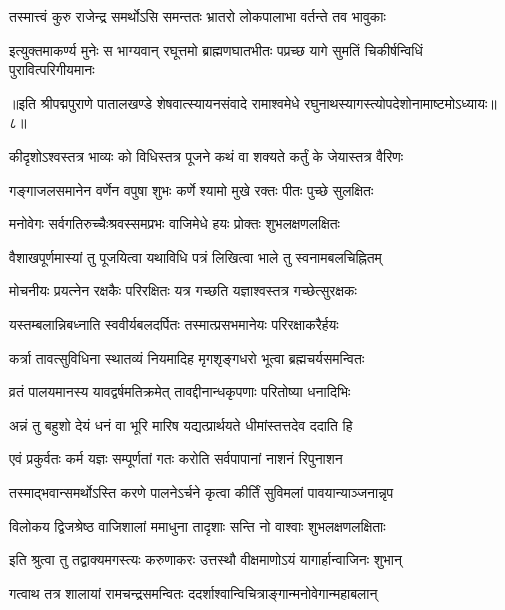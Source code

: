 \twolineshloka
{तस्मात्त्वं कुरु राजेन्द्र समर्थोऽसि समन्ततः}
{भ्रातरो लोकपालाभा वर्तन्ते तव भावुकाः}%

\twolineshloka
{इत्युक्तमाकर्ण्य मुनेः स भाग्यवान् रघूत्तमो ब्राह्मणघातभीतः}
{पप्रच्छ यागे सुमतिं चिकीर्षन्विधिं पुरावित्परिगीयमानः}%

{॥इति श्रीपद्मपुराणे पातालखण्डे शेषवात्स्यायनसंवादे रामाश्वमेधे रघुनाथस्यागस्त्योपदेशोनामाष्टमोऽध्यायः॥८॥}

\resetShloka


\twolineshloka
{कीदृशोऽश्वस्तत्र भाव्यः को विधिस्तत्र पूजने}
{कथं वा शक्यते कर्तुं के जेयास्तत्र वैरिणः}%


\twolineshloka
{गङ्गाजलसमानेन वर्णेन वपुषा शुभः}
{कर्णे श्यामो मुखे रक्तः पीतः पुच्छे सुलक्षितः}%

\twolineshloka
{मनोवेगः सर्वगतिरुच्चैःश्रवस्समप्रभः}
{वाजिमेधे हयः प्रोक्तः शुभलक्षणलक्षितः}%

\twolineshloka
{वैशाखपूर्णमास्यां तु पूजयित्वा यथाविधि}
{पत्रं लिखित्वा भाले तु स्वनामबलचिह्नितम्}%

\twolineshloka
{मोचनीयः प्रयत्नेन रक्षकैः परिरक्षितः}
{यत्र गच्छति यज्ञाश्वस्तत्र गच्छेत्सुरक्षकः}%

\twolineshloka
{यस्तम्बलान्निबध्नाति स्ववीर्यबलदर्पितः}
{तस्मात्प्रसभमानेयः परिरक्षाकरैर्हयः}%

\twolineshloka
{कर्त्रा तावत्सुविधिना स्थातव्यं नियमादिह}
{मृगशृङ्गधरो भूत्वा ब्रह्मचर्यसमन्वितः}%

\twolineshloka
{व्रतं पालयमानस्य यावद्वर्षमतिक्रमेत्}
{तावद्दीनान्धकृपणाः परितोष्या धनादिभिः}%

\twolineshloka
{अन्नं तु बहुशो देयं धनं वा भूरि मारिष}
{यद्यत्प्रार्थयते धीमांस्तत्तदेव ददाति हि}%

\twolineshloka
{एवं प्रकुर्वतः कर्म यज्ञः सम्पूर्णतां गतः}
{करोति सर्वपापानां नाशनं रिपुनाशन}%

\twolineshloka
{तस्माद्भवान्समर्थोऽस्ति करणे पालनेऽर्चने}
{कृत्वा कीर्तिं सुविमलां पावयान्याञ्जनान्नृप}%


\twolineshloka
{विलोकय द्विजश्रेष्ठ वाजिशालां ममाधुना}
{तादृशाः सन्ति नो वाश्वाः शुभलक्षणलक्षिताः}%

\twolineshloka
{इति श्रुत्वा तु तद्वाक्यमगस्त्यः करुणाकरः}
{उत्तस्थौ वीक्षमाणोऽयं यागार्हान्वाजिनः शुभान्}%

\twolineshloka
{गत्वाथ तत्र शालायां रामचन्द्रसमन्वितः}
{ददर्शाश्वान्विचित्राङ्गान्मनोवेगान्महाबलान्}%

